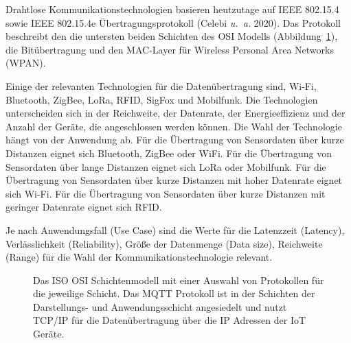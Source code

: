 \documentclass[
  11pt,
  a4paper,
  oneside, openany  ,captions=tableheading
]{scrbook}
\theoremstyle{remark}
\begin{document}
Drahtlose Kommunikationstechnologien basieren heutzutage auf IEEE
802.15.4 sowie IEEE 802.15.4e Übertragungsprotokoll (Celebi \emph{u.~a.}
2020). Das Protokoll beschreibt den die untersten beiden Schichten des
OSI Modells (Abbildung~\ref{fig-osimodell}), die Bitübertragung und den
MAC-Layer für Wireless Personal Area Networks (WPAN).

Einige der relevanten Technologien für die Datenübertragung sind, Wi-Fi,
Bluetooth, ZigBee, LoRa, RFID, SigFox und Mobilfunk. Die Technologien
unterscheiden sich in der Reichweite, der Datenrate, der
Energieeffizienz und der Anzahl der Geräte, die angeschlossen werden
können. Die Wahl der Technologie hängt von der Anwendung ab. Für die
Übertragung von Sensordaten über kurze Distanzen eignet sich Bluetooth,
ZigBee oder WiFi. Für die Übertragung von Sensordaten über lange
Distanzen eignet sich LoRa oder Mobilfunk. Für die Übertragung von
Sensordaten über kurze Distanzen mit hoher Datenrate eignet sich Wi-Fi.
Für die Übertragung von Sensordaten über kurze Distanzen mit geringer
Datenrate eignet sich RFID.

Je nach Anwendungsfall (Use Case) sind die Werte für die Latenzzeit
(Latency), Verlässlichkeit (Reliability), Größe der Datenmenge (Data
size), Reichweite (Range) für die Wahl der Kommunikationstechnologie
relevant.

\begin{figure}


\caption{\label{fig-osimodell}Das ISO OSI Schichtenmodell mit einer
Auswahl von Protokollen für die jeweilige Schicht. Das MQTT Protokoll
ist in der Schichten der Darstellungs- und Anwendungsschicht angesiedelt
und nutzt TCP/IP für die Datenübertragung über die IP Adressen der IoT
Geräte.}

\end{figure}%
\end{document}
